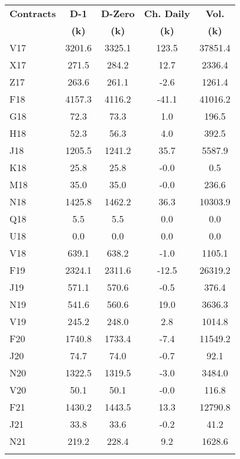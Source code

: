 \documentclass[article,crop=false]{standalone}%
\begin{document}
%
\normalsize%
\setlength{\tabcolsep}{0.15cm}%
\begin{tabular}[h]{l | c c c c}%
\hline%
\rowcolor{white}%
\textbf{Contracts}&\textbf{D{-}1}&\textbf{D{-}Zero}&\textbf{Ch. Daily}&\textbf{Vol.}\\%
\rowcolor{white}%
\textbf{}&\textbf{(k)}&\textbf{(k)}&\textbf{(k)}&\textbf{(k)}\\%
\hline%
\rowcolor{lightgray}%
V17&3201.6&3325.1&123.5&37851.4\\%
\rowcolor{white}%
X17&271.5&284.2&12.7&2336.4\\%
\rowcolor{lightgray}%
Z17&263.6&261.1&{-}2.6&1261.4\\%
\rowcolor{white}%
F18&4157.3&4116.2&{-}41.1&41016.2\\%
\rowcolor{lightgray}%
G18&72.3&73.3&1.0&196.5\\%
\rowcolor{white}%
H18&52.3&56.3&4.0&392.5\\%
\rowcolor{lightgray}%
J18&1205.5&1241.2&35.7&5587.9\\%
\rowcolor{white}%
K18&25.8&25.8&{-}0.0&0.5\\%
\rowcolor{lightgray}%
M18&35.0&35.0&{-}0.0&236.6\\%
\rowcolor{white}%
N18&1425.8&1462.2&36.3&10303.9\\%
\rowcolor{lightgray}%
Q18&5.5&5.5&0.0&0.0\\%
\rowcolor{white}%
U18&0.0&0.0&0.0&0.0\\%
\rowcolor{lightgray}%
V18&639.1&638.2&{-}1.0&1105.1\\%
\rowcolor{white}%
F19&2324.1&2311.6&{-}12.5&26319.2\\%
\rowcolor{lightgray}%
J19&571.1&570.6&{-}0.5&376.4\\%
\rowcolor{white}%
N19&541.6&560.6&19.0&3636.3\\%
\rowcolor{lightgray}%
V19&245.2&248.0&2.8&1014.8\\%
\rowcolor{white}%
F20&1740.8&1733.4&{-}7.4&11549.2\\%
\rowcolor{lightgray}%
J20&74.7&74.0&{-}0.7&92.1\\%
\rowcolor{white}%
N20&1322.5&1319.5&{-}3.0&3484.0\\%
\rowcolor{lightgray}%
V20&50.1&50.1&{-}0.0&116.8\\%
\rowcolor{white}%
F21&1430.2&1443.5&13.3&12790.8\\%
\rowcolor{lightgray}%
J21&33.8&33.6&{-}0.2&41.2\\%
\rowcolor{white}%
N21&219.2&228.4&9.2&1628.6\\%
\rowcolor{lightgray}%

\end{tabular}
\end{document}
